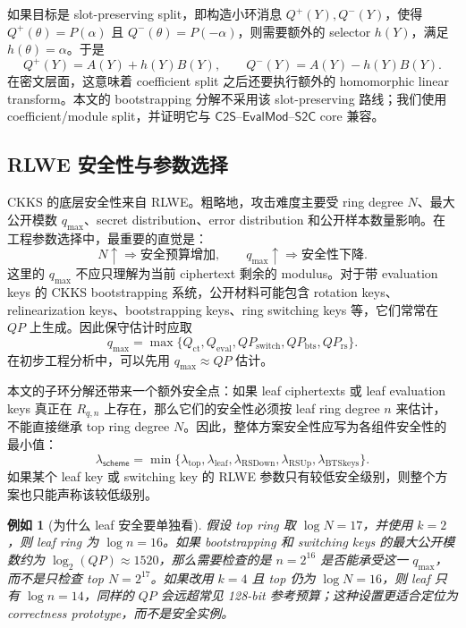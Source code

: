 \documentclass[UTF8,11pt]{article}
\newcommand{\CtwoS}{\mathsf{C2S}}
\newcommand{\StwoC}{\mathsf{S2C}}
\newcommand{\EvalMod}{\mathsf{EvalMod}}
\theoremstyle{definition}
\theoremstyle{plain}
\newtheorem{example}{例如}
\begin{document}
如果目标是 slot-preserving split，即构造小环消息 \(Q^+(Y),Q^-(Y)\)，使得 \(Q^+(\theta)=P(\alpha)\) 且 \(Q^-(\theta)=P(-\alpha)\)，则需要额外的 selector \(h(Y)\)，满足 \(h(\theta)=\alpha\)。于是
\[
Q^+(Y)=A(Y)+h(Y)B(Y),
\qquad
Q^-(Y)=A(Y)-h(Y)B(Y).
\]
在密文层面，这意味着 coefficient split 之后还要执行额外的 homomorphic linear transform。本文的 bootstrapping 分解不采用该 slot-preserving 路线；我们使用 coefficient/module split，并证明它与 \(\CtwoS\)--\(\EvalMod\)--\(\StwoC\) core 兼容。

\subsection{RLWE 安全性与参数选择}
\label{subsec:security-prelim}

CKKS 的底层安全性来自 RLWE。粗略地，攻击难度主要受 ring degree \(N\)、最大公开模数 \(q_{\max}\)、secret distribution、error distribution 和公开样本数量影响。在工程参数选择中，最重要的直觉是：
\[
N\uparrow \Rightarrow \text{安全预算增加},
\qquad
q_{\max}\uparrow \Rightarrow \text{安全性下降}.
\]
这里的 \(q_{\max}\) 不应只理解为当前 ciphertext 剩余的 modulus。对于带 evaluation keys 的 CKKS bootstrapping 系统，公开材料可能包含 rotation keys、relinearization keys、bootstrapping keys、ring switching keys 等，它们常常在 \(QP\) 上生成。因此保守估计时应取
\[
q_{\max}
=
\max\{
Q_{\mathrm{ct}},
Q_{\mathrm{eval}},
QP_{\mathrm{switch}},
QP_{\mathrm{bts}},
QP_{\mathrm{rs}}
\}.
\]
在初步工程分析中，可以先用 \(q_{\max}\approx QP\) 估计。

本文的子环分解还带来一个额外安全点：如果 leaf ciphertexts 或 leaf evaluation keys 真正在 \(R_{q,n}\) 上存在，那么它们的安全性必须按 leaf ring degree \(n\) 来估计，不能直接继承 top ring degree \(N\)。因此，整体方案安全性应写为各组件安全性的最小值：
\[
\lambda_{\mathsf{scheme}}
=
\min\{
\lambda_{\mathrm{top}},
\lambda_{\mathrm{leaf}},
\lambda_{\mathrm{RSDown}},
\lambda_{\mathrm{RSUp}},
\lambda_{\mathrm{BTSkeys}}
\}.
\]
如果某个 leaf key 或 switching key 的 RLWE 参数只有较低安全级别，则整个方案也只能声称该较低级别。

\begin{example}[为什么 leaf 安全要单独看]
假设 top ring 取 \(\log N=17\)，并使用 \(k=2\)，则 leaf ring 为 \(\log n=16\)。如果 bootstrapping 和 switching keys 的最大公开模数约为 \(\log_2(QP)\approx 1520\)，那么需要检查的是 \(n=2^{16}\) 是否能承受这一 \(q_{\max}\)，而不是只检查 top \(N=2^{17}\)。如果改用 \(k=4\) 且 top 仍为 \(\log N=16\)，则 leaf 只有 \(\log n=14\)，同样的 \(QP\) 会远超常见 128-bit 参考预算；这种设置更适合定位为 correctness prototype，而不是安全实例。
\end{example}
\end{document}
